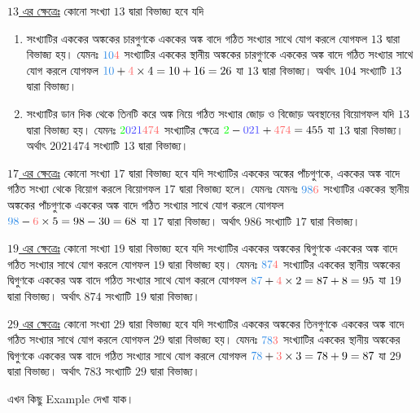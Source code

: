 \documentclass[a4paper,11pt]{article}
\begin{document}
\underline{$13$ এর ক্ষেত্রেঃ} কোনো সংখ্যা $13$ দ্বারা বিভাজ্য হবে যদি 
\begin{enumerate}[label=(\alph*),noitemsep]
	\item সংখ্যাটির এককের অঙ্ককের চারগুণকে এককের অঙ্ক বাদে গঠিত সংখ্যার সাথে যোগ করলে যোগফল $13$ দ্বারা বিভাজ্য হয়। যেমনঃ $\textcolor{bleudefrance}{10}\textcolor{red!60}{4}$ সংখ্যাটির এককের স্থানীয় অঙ্ককের চারগুণকে এককের অঙ্ক বাদে গঠিত সংখ্যার সাথে যোগ করলে যোগফল $\textcolor{bleudefrance}{10}+\textcolor{red!60}{4}\times 4=10+16=26$ যা $13$ দ্বারা বিভাজ্য। অর্থাৎ $104$ সংখ্যাটি $13$ দ্বারা বিভাজ্য।
	\item সংখ্যাটির ডান দিক থেকে তিনটি করে অঙ্ক নিয়ে গঠিত সংখ্যার জোড় ও বিজোড় অবস্থানের বিয়োগফল যদি $13$ দ্বারা বিভাজ্য হয়। যেমনঃ $\textcolor{green}{2}\textcolor{blue!70}{021}\textcolor{red!60}{474}$ সংখ্যাটির ক্ষেত্রে $\textcolor{green}{2}-\textcolor{blue!70}{021}+\textcolor{red!60}{474}=455$ যা $13$ দ্বারা বিভাজ্য। অর্থাৎ $2021474$ সংখ্যাটি $13$ দ্বারা বিভাজ্য।
\end{enumerate}
\underline{$17$ এর ক্ষেত্রেঃ} কোনো সংখ্যা $17$ দ্বারা বিভাজ্য হবে যদি সংখ্যাটির এককের অঙ্কের পাঁচগুণকে, এককের অঙ্ক বাদে গঠিত সংখ্যা থেকে বিয়োগ করলে বিয়োগফল $17$ দ্বারা বিভাজ্য হলে। যেমনঃ যেমনঃ $\textcolor{bleudefrance}{98}\textcolor{red!60}{6}$ সংখ্যাটির এককের স্থানীয় অঙ্ককের পাঁচগুণকে এককের অঙ্ক বাদে গঠিত সংখ্যার সাথে যোগ করলে যোগফল $\textcolor{bleudefrance}{98}-\textcolor{red!60}{6}\times 5=98-30=68$ যা $17$ দ্বারা বিভাজ্য। অর্থাৎ $986$ সংখ্যাটি $17$ দ্বারা বিভাজ্য।

\underline{$19$ এর ক্ষেত্রেঃ} কোনো সংখ্যা $19$ দ্বারা বিভাজ্য হবে যদি সংখ্যাটির এককের অঙ্ককের দ্বিগুণকে এককের অঙ্ক বাদে গঠিত সংখ্যার সাথে যোগ করলে যোগফল $19$ দ্বারা বিভাজ্য হয়। যেমনঃ $\textcolor{bleudefrance}{87}\textcolor{red!60}{4}$ সংখ্যাটির এককের স্থানীয় অঙ্ককের দ্বিগুণকে এককের অঙ্ক বাদে গঠিত সংখ্যার সাথে যোগ করলে যোগফল $\textcolor{bleudefrance}{87}+\textcolor{red!60}{4}\times 2=87+8=95$ যা $19$ দ্বারা বিভাজ্য। অর্থাৎ $874$ সংখ্যাটি $19$ দ্বারা বিভাজ্য।

\underline{$29$ এর ক্ষেত্রেঃ} কোনো সংখ্যা $29$ দ্বারা বিভাজ্য হবে যদি সংখ্যাটির এককের অঙ্ককের তিনগুণকে এককের অঙ্ক বাদে গঠিত সংখ্যার সাথে যোগ করলে যোগফল $29$ দ্বারা বিভাজ্য হয়। যেমনঃ $\textcolor{bleudefrance}{78}\textcolor{red!60}{3}$ সংখ্যাটির এককের স্থানীয় অঙ্ককের দ্বিগুণকে এককের অঙ্ক বাদে গঠিত সংখ্যার সাথে যোগ করলে যোগফল $\textcolor{bleudefrance}{78}+\textcolor{red!60}{3}\times 3=78+9=87$ যা $29$ দ্বারা বিভাজ্য। অর্থাৎ $783$ সংখ্যাটি $29$ দ্বারা বিভাজ্য।

এখন কিছু Example দেখা যাক। 
\end{document}
